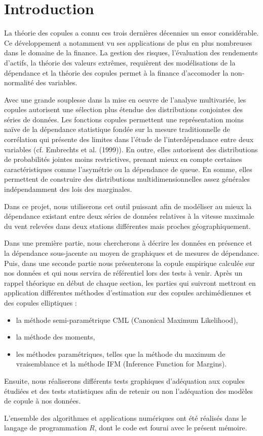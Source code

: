 \section*{Introduction} %

La théorie des copules a connu ces trois dernières décennies un essor considérable.
Ce développement a notamment vu ses applications de plus en plus nombreuses dans le domaine de la finance.
La gestion des risques, l'évaluation des rendements d'actifs, la théorie des valeurs extrêmes, requièrent des modélisations de
la dépendance et la théorie des copules permet à la finance d'accomoder la non-normalité des variables.

Avec une grande souplesse dans la mise en oeuvre de l'analyse multivariée, les copules autorisent une  sélection plus étendue des distributions conjointes des séries de données.
Les fonctions copules permettent une représentation moins naïve de la dépendance statistique fondée sur la mesure traditionnelle de corrélation qui présente des limites dans l'étude de l'interdépendance entre deux variables (cf. Embrechts et al. (1999)). 
En outre, elles autorisent des distributions de probabilités jointes moins restrictives, prenant  mieux en compte certaines caractéristiques comme l'asymétrie ou la dépendance de queue.
En somme, elles permettent de construire des distributions multidimensionnelles assez générales indépendamment des lois des marginales.

Dans ce projet, nous utiliserons cet outil puissant afin de modéliser au mieux la dépendance existant entre deux séries de données relatives 
à la vitesse maximale du vent relevées dans deux stations différentes mais proches géographiquement.

Dans une première partie, nous chercherons à décrire les données en présence et la dépendance sous-jacente au moyen de graphiques et de mesures de dépendance.
Puis, dans une seconde partie nous présenterons la copule empirique calculée sur nos données et qui nous servira de référentiel lors des tests à venir. Après un rappel théorique en début de chaque section, les parties qui suivront mettront en application différentes méthodes d'estimation sur des copules archimédiennes et des copules elliptiques :

\begin{itemize}
\item la méthode semi-paramétrique CML (Canonical Maximum Likelihood),
\item la méthode des moments,
\item les méthodes paramétriques, telles que la méthode du maximum de vraisemblance et la méthode IFM (Inference Function for Margins).
\end{itemize} 

Ensuite, nous réaliserons différents tests graphiques d'adéquation aux copules étudiées et des tests statistiques afin de retenir ou non l'adéquation des modèles de copule à nos données. 

L'ensemble des algorithmes et applications numériques ont été réalisés dans le langage de programmation $R$, dont le code est fourni avec le présent mémoire.
